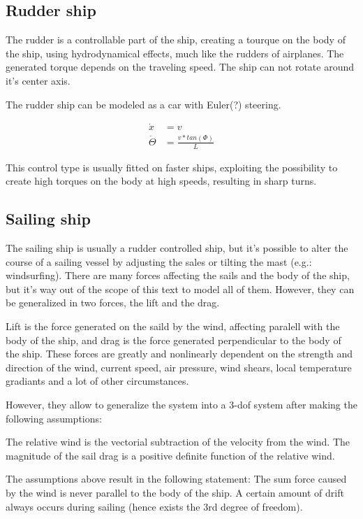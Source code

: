 \subsection{Rudder ship}

The rudder is a controllable part of the ship, creating a tourque on the body of the ship, using hydrodynamical effects, much like the rudders of airplanes. The generated torque depends on the traveling speed. The ship can not rotate around it’s center axis.

The rudder ship can be modeled as a car with Euler(?) steering.

\begin{align}
	\dot{x} &= v \\
	\dot{\Theta} &= \frac{v * tan(\Phi)}{L}
\end{align}

This control type is usually fitted on faster ships, exploiting the possibility to create high torques on the body at high speeds, resulting in sharp turns.

\subsection{Sailing ship}

The sailing ship is usually a rudder controlled ship, but it’s possible to alter the course of a sailing vessel by adjusting the sales or tilting the mast (e.g.: windsurfing).
There are many forces affecting the sails and the body of the ship, but it’s way out of the scope of this text to model all of them. However, they can be generalized in two forces, the lift and the drag.

Lift is the force generated on the saild by the wind, affecting paralell with the body of the ship, and drag is the force generated perpendicular to the body of the ship. These forces are greatly and nonlinearly dependent on the strength and direction of the wind, current speed, air pressure, wind shears, local temperature gradiants and a lot of other circumstances.

However, they allow to generalize the system into a 3-dof system after making the following assumptions:

The relative wind is the vectorial subtraction of the velocity from the wind.
The magnitude of the sail drag is a positive definite function of the relative wind.

The assumptions above result in the following statement:
The sum force caused by the wind is never parallel to the body of the ship. A certain amount of drift always occurs during sailing (hence exists the 3rd degree of freedom).

